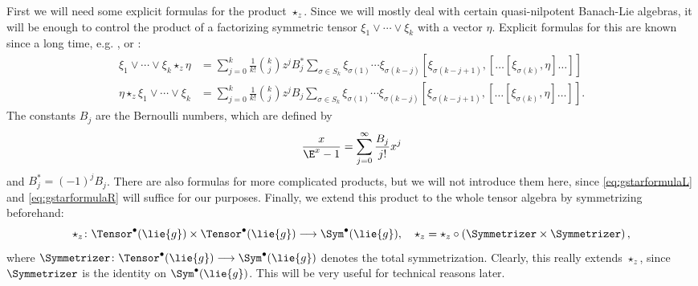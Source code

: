 \documentclass[
11pt,                          %
english                        %
]{article}
\begin{document}
First we will need some explicit formulas for the product $\star_z$. Since we will 
mostly deal with certain quasi-nilpotent Banach-Lie algebras, it will be enough to 
control the product of a factorizing symmetric tensor $\xi_1 \vee \cdots \vee \xi_k$ 
with a vector $\eta$. Explicit formulas for this are known since a long time, e.g. 
\cite[Prop. 1]{gutt:1983a}, \cite[2.8.12 (c)]{dixmier:1977a} or \cite[Prop. 2.6]
{esposito.stapor.waldmann:2015a:pre}:
\begin{align}
    \label{eq:gstarformulaR}
    \xi_1 \vee \cdots \vee \xi_k \star_z \eta
    &=
    \sum\limits_{j=0}^k
    \frac{1}{k!} \binom{k}{j}
    z^j B_j^*
    \sum\limits_{\sigma \in S_k}
    \xi_{\sigma(1)} \cdots \xi_{\sigma(k - j)}
    [\xi_{\sigma(k - j + 1)},
    [ \ldots [\xi_{\sigma(k)}, \eta] \ldots ]
    ]
    \\
    \label{eq:gstarformulaL}
    \eta \star_z \xi_1 \vee \cdots \vee \xi_k
    &=
    \sum\limits_{j=0}^k
    \frac{1}{k!} \binom{k}{j}
    z^j B_j
    \sum\limits_{\sigma \in S_k}
    \xi_{\sigma(1)} \cdots \xi_{\sigma(k - j)}
    [\xi_{\sigma(k - j + 1)},
    [ \ldots [\xi_{\sigma(k)}, \eta] \ldots ]
    ]
    .    
\end{align}
The constants $B_j$ are the Bernoulli numbers, which are defined by
\begin{equation}
	\frac{x}{\E^x - 1}
	=
	\sum\limits_{j=0}^\infty
	\frac{B_j}{j!}
	x^j
\end{equation}
and $B_j^* = (-1)^j B_j$. There are also formulas for more complicated products, but 
we will not introduce them here, since \eqref{eq:gstarformulaL} and 
\eqref{eq:gstarformulaR} will suffice for our purposes. Finally, we extend this 
product to the whole tensor algebra by symmetrizing beforehand:
\begin{equation}
	\label{eq:extended-gstar}
	\star_z
	\colon
	\Tensor^{\bullet}(\lie{g})
	\times
	\Tensor^{\bullet}(\lie{g})
	\longrightarrow
	\Sym^{\bullet}(\lie{g})
	, \quad
	\star_z
	=
	\star_z
	\circ
	\left(
		\Symmetrizer \times \Symmetrizer
	\right),
\end{equation}
where $\Symmetrizer \colon \Tensor^{\bullet}(\lie{g}) \longrightarrow \Sym^{\bullet}
(\lie{g})$ denotes the total symmetrization. Clearly, this really extends $\star_z$, 
since $\Symmetrizer$ is the identity on $\Sym^{\bullet}(\lie{g})$. This will be very 
useful for technical reasons later.
\end{document}
